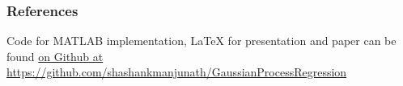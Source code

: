 \documentclass[pdf]{beamer}
\begin{document}
\begin{frame}[shrink=30]
  \frametitle{References}
  
  

  Code for MATLAB implementation, LaTeX for presentation and paper can be found
  \href{https://github.com/shashankmanjunath/GaussianProcessRegression}{on Github at
  https://github.com/shashankmanjunath/GaussianProcessRegression}

\end{frame}
\end{document}
